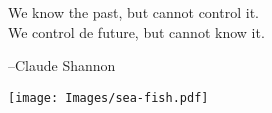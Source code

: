 
\epigraph{We know the past, but cannot control it. \\
We control de future, but cannot know it.}{--Claude Shannon}
\vspace*{\fill}
\begin{fullwidth}
\begin{center}
    \texttt{[image: Images/sea-fish.pdf]}
\end{center}
\end{fullwidth}